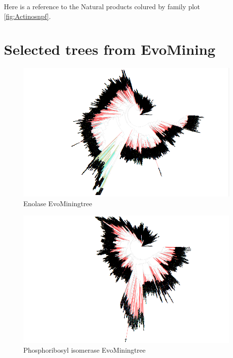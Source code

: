 \documentclass[12pt,twoside]{reedthesis}
\begin{document}
  Here is a reference to the Natural products colured by family plot
  \autoref{fig:Actinosnpf}. \clearpage 
  
  \section{Selected trees from
  EvoMining}\label{selected-trees-from-evomining-1}
  
  \begin{figure}[h!tbp]
  \centering
  \includegraphics[angle = 180,scale = 0.3]{chapter4/tree15.png}
  \caption[Enolase EvoMiningtree]{\normalsize{Enolase EvoMiningtree}}
  \label{fig:enolase_evo_tree}
  \end{figure}\begin{figure}[h!tbp]
  \centering
  \includegraphics[angle = 180,scale = 0.3]{chapter4/tree73.png}
  \caption[Phosphoribosyl isomerase EvoMiningtree]{\normalsize{Phosphoribosyl isomerase EvoMiningtree}}
  \label{fig:Phosphoribosyl_isomerase_evo_tree}

\end{figure}
\end{document}
